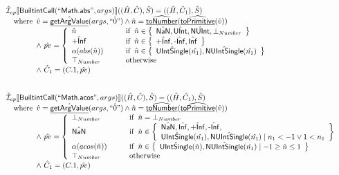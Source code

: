 \documentclass{article}
\newcommand{\SF}[1]{\mbox{\textsf{#1}}}
\newcommand{\wherec}[1]{{\rm where}\begin{array}[t]{l}#1\end{array}}
\newcommand{\ifc}[1]{{\rm if}\begin{array}[t]{l}#1\end{array}}
\newcommand{\owc}{{\rm otherwise}}
\newcommand{\aI}{\hat{\mathcal{I}}}
\newcommand{\set}[1]{\left\{\begin{array}{l}#1\end{array}\right\}}
\newcommand{\lbr}{\llbracket}
\newcommand{\rbr}{\rrbracket}
\newcommand{\hf}[1]{\underline{\sf #1}}
\newcommand{\ahf}[1]{\widehat{\underline{\sf #1}}}
\begin{document}
\[
\begin{array}{l}
\aI _{cp}\lbr \SF{BuiltintCall}(``\SF{Math.abs}",args)\rbr((\hat{H},\hat{C}), \hat{S})
  = ((\hat{H}, \hat{C}_1), \hat{S})\\
\quad\wherec{
  \hat{v}=\hat{\hf{getArgValue}}(args,\hat{``0"}) \land \hat{n}=\ahf{toNumber}(\ahf{toPrimitive}(\hat{v}))\\
  \land\ \hat{pv}   = 
  \left\{
    \begin{array}{l@{\quad\quad\quad}l}
      \hat{n}  & \ifc{\hat{n} \in \set{\hat{\SF{NaN}}, \hat{\SF{UInt}}, \hat{\SF{NUInt}}, \bot_{Number}}}\\
      \hat{\SF{+Inf}} & \ifc{\hat{n} \in \set{\hat{\SF{+Inf}}, \hat{\SF{-Inf}}, \hat{\SF{Inf}}}}\\
      \alpha(abs(\hat{n})) & \ifc{\hat{n} \in \set{\hat{\SF{UIntSingle}}(\hat{n_1}), \hat{\SF{NUIntSingle}}(\hat{n_1})}}\\
      \top_{Number} & \owc\\
    \end{array}
  \right.\\
  \land\ \hat{C}_1 = (C.1, \hat{pv})
  }\\
\\\\


\aI _{cp}\lbr \SF{BuiltintCall}(``\SF{Math.acos}",args)\rbr((\hat{H},\hat{C}), \hat{S})
  = ((\hat{H}, \hat{C}_1), \hat{S})\\
\quad\wherec{
  \hat{v}=\hat{\hf{getArgValue}}(args,\hat{``0"}) \land \hat{n}=\ahf{toNumber}(\ahf{toPrimitive}(\hat{v}))\\
  \land\ \hat{pv} = 
  \left\{
    \begin{array}{l@{\quad\quad\quad}l}
      \bot_{Number} & \ifc{\hat{n} = \bot_{Number}}\\
      \hat{\SF{NaN}} & \ifc{\hat{n} \in \set{\hat{\SF{NaN}}, \hat{\SF{Inf}}, \hat{\SF{+Inf}}, \hat{\SF{-Inf}}, \\\hat{\SF{UIntSingle}}(\hat{n_1}), \hat{\SF{NUIntSingle}}(\hat{n_1}) \mid n_1<-1 \lor 1<n_1}}\\
      \alpha(acos(\hat{n})) & \ifc{\hat{n} \in \set{\hat{\SF{UIntSingle}}(\hat{n}), \hat{\SF{NUIntSingle}}(\hat{n_1}) \mid -1\geq \hat{n} \leq 1}}\\
      \top_{Number} & \owc\\
    \end{array}
  \right.\\
  \land\ \hat{C}_1 = (C.1, \hat{pv})
  }\\
\\\\




\end{array}\]
\end{document}
